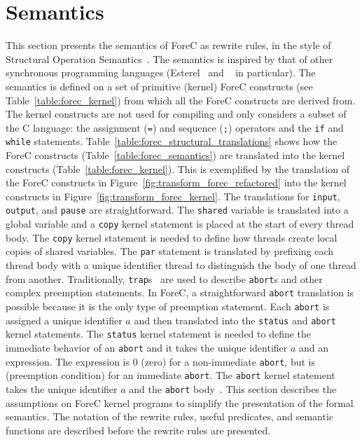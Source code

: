 \section{Semantics}
\label{sec:formalSemantics}

This section presents the semantics of ForeC as rewrite rules,
in the style of Structural Operation Semantics~\cite{semantics_sos}. 
The semantics is inspired by that of other synchronous programming
languages (Esterel~\cite{timed_compiling_esterel} and \pretc{}~\cite{pret_pretc} in particular).
The semantics is defined on a set of primitive (kernel) ForeC constructs
(see Table~\ref{table:forec_kernel}) from which all the ForeC 
constructs are derived from. The kernel constructs are not used for compiling
and only considers a subset of the C language: the assignment (\verb$=$)
and sequence (\verb$;$) operators and the \verb$if$ and \verb$while$ statements. 
Table~\ref{table:forec_structural_translations} shows how the
ForeC constructs (Table~\ref{table:forec_semantics}) are translated into the kernel 
constructs (Table~\ref{table:forec_kernel}). This is exemplified by the 
translation of the ForeC constructs in Figure~\ref{fig:transform_forec_refactored} 
into the kernel constructs in Figure~\ref{fig:transform_forec_kernel}. 
The translations for \verb$input$, \verb$output$, and \verb$pause$ are
straightforward. The \verb$shared$ variable is translated into
a global variable and a \verb$copy$ kernel statement is placed at
the start of every thread body. The
\verb$copy$ kernel statement is needed to define how threads
create local copies of shared variables.
The \verb$par$ statement is translated by prefixing each
thread body \body{} with a unique identifier thread \thread{} to 
distinguish the body of one thread from another. 
Traditionally, \verb$trap$s~\cite{timed_compiling_esterel} are used 
to describe \verb$abort$s and other complex preemption statements. 
In ForeC, a straightforward \verb$abort$ translation is 
possible because it is the only type of preemption statement.
Each \verb$abort$ is assigned a unique identifier $a$ and then 
translated into the \verb$status$ and \verb$abort$ kernel
statements. The \verb$status$ kernel statement is needed to
define the immediate behavior of an \verb$abort$ and it takes the
unique identifier $a$ and an expression. The expression is
0 (zero) for a non-immediate \verb$abort$, but is \expression{}
(preemption condition) for an immediate \verb$abort$. The
\verb$abort$ kernel statement takes the unique
identifier $a$ and the \verb$abort$ body~\body{}. This section
describes the assumptions on ForeC kernel programs to 
simplify the presentation of the formal semantics. The notation
of the rewrite rules, useful predicates, and semantic functions 
are described before the rewrite rules are presented.

